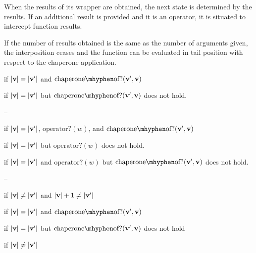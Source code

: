 \documentclass{sigplanconf}
\begin{document}

When the results of its wrapper are obtained, the next state is determined by the results.
If an additional result is provided and it is an operator, it is situated to intercept function results.

If the number of results obtained is the same as the number of arguments given, the interposition ceases and the function can be evaluated in tail position with respect to the chaperone application.

if $|\mathbf{v}|=|\mathbf{v'}|$ and $\mathrm{chaperone\mhyphen of?}(\vvp,\vv)$

if $|\mathbf{v}|=|\mathbf{v'}|$ but $\mathrm{chaperone\mhyphen of?}(\vvp,\vv)$ does not hold.

--

if $|\mathbf{v}|=|\mathbf{v'}|$, $\mathrm{operator?}(w)$, and $\mathrm{chaperone\mhyphen of?}(\vvp,\vv)$

if $|\mathbf{v}|=|\mathbf{v'}|$ but $\mathrm{operator?}(w)$ does not hold.

if $|\mathbf{v}|=|\mathbf{v'}|$ and $\mathrm{operator?}(w)$ but $\mathrm{chaperone\mhyphen of?}(\vvp,\vv)$ does not hold.

--

if $|\mathbf{v}|\ne|\mathbf{v'}|$ and $|\mathbf{v}|+1\ne|\mathbf{v'}|$







\red{\sval{\chacrk{\vv}::\ks}{\sigma}{\vvp}}{\sval{\ks}{\sigma}{\vvp}}
if $|\mathbf{v}|=|\mathbf{v'}|$ and $\mathrm{chaperone\mhyphen of?}(\vvp,\vv)$

if $|\mathbf{v}|=|\mathbf{v'}|$ but $\mathrm{chaperone\mhyphen of?}(\vvp,\vv)$ does not hold

if $|\mathbf{v}|\ne|\mathbf{v'}|$
\end{document}

